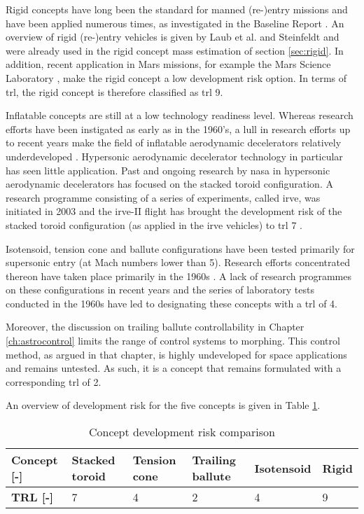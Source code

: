 Rigid concepts have long been the standard for manned (re-)entry missions and have been applied numerous times, as investigated in the Baseline Report \cite[p.2-3]{Balasooriyan2015a}. An overview of rigid (re-)entry vehicles is given by Laub et al. \cite{Laub2004} and Steinfeldt \cite{Steinfeldt2009} and were already used in the rigid concept mass estimation of section \ref{sec:rigid}. In addition, recent application in Mars missions, for example the Mars Science Laboratory \cite{Schoenenberger2009}, make the rigid concept a low development risk option. In terms of \gls{trl}, the rigid concept is therefore classified as \gls{trl} 9.

Inflatable concepts are still at a low technology readiness level. Whereas research efforts have been instigated as early as in the 1960's, a lull in research efforts up to recent years make the field of inflatable aerodynamic decelerators relatively underdeveloped \cite{Smith2010}. Hypersonic aerodynamic decelerator technology in particular has seen little application. Past and ongoing research by \gls{nasa} in hypersonic aerodynamic decelerators has focused on the stacked toroid configuration. A research programme consisting of a series of experiments, called \gls{irve}, was initiated in 2003 and the \gls{irve}-II flight has brought the development risk of the stacked toroid configuration (as applied in the \gls{irve} vehicles) to \gls{trl} 7 \cite{Player2005}.

Isotensoid, tension cone and ballute configurations have been tested primarily for supersonic entry (at Mach numbers lower than 5). Research efforts concentrated thereon have taken place primarily in the 1960s \cite{Smith2010}. A lack of research programmes on these configurations in recent years and the series of laboratory tests conducted in the 1960s have led to designating these concepts with a \gls{trl} of 4.

Moreover, the discussion on trailing ballute controllability in Chapter \ref{ch:astrocontrol} limits the range of control systems to morphing. This control method, as argued in that chapter, is highly undeveloped for space applications and remains untested. As such, it is a concept that remains formulated with a corresponding \gls{trl} of 2.

An overview of development risk for the five concepts is given in Table \ref{tab:concrisk}.

\begin{table}[h]
\centering
\caption{Concept development risk comparison}
\begin{tabular}{|l|l|l|l|l|l|}
\hline
\textbf{Concept {[}-{]}} & Stacked toroid & Tension cone & Trailing ballute & Isotensoid & Rigid \\ \hline
\textbf{TRL {[}-{]}}     & 7              & 4            & 2                & 4          & 9     \\ \hline
\end{tabular}
\label{tab:concrisk}
\end{table}

